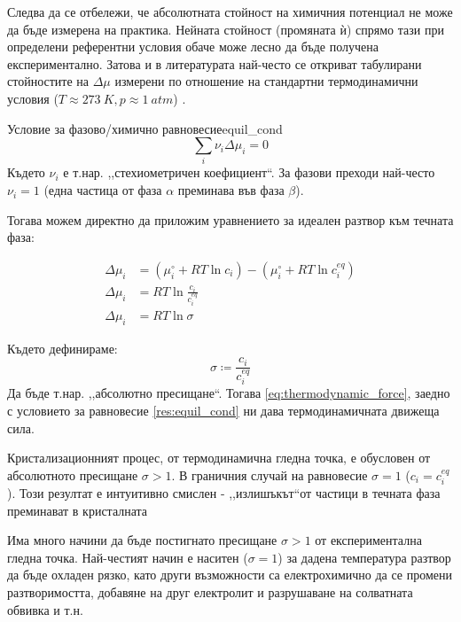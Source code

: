 \noindent Следва да се отбележи, че абсолютната стойност на химичния потенциал не може да бъде измерена на практика. Нейната стойност (промяната ѝ) спрямо тази при определени референтни условия обаче може лесно да бъде получена експериментално. Затова и в литературата най-често се откриват табулирани стойностите на $\Delta \mu$ измерени по отношение на стандартни термодинамични условия ($T \approx 273~K, p \approx 1~atm$) \cite{IvanMarkovCGB}\cite{atkinspaula2008}.

\begin{result}{Условие за фазово/химично равновесие}{equil_cond}
	\[\sum\limits_i \nu_i\Delta \mu_i  = 0\]
	Където $\nu_i$ е т.нар. ,,стехиометричен коефициент``. За фазови преходи най-често $\nu_i = 1$ (една частица от фаза $\alpha$ преминава във фаза $\beta$).
\end{result}

\noindent Тогава можем директно да приложим уравнението за идеален разтвор към течната фаза:

\begin{align}
	\Delta \mu_{i} & = \left( \mu_{i}^\circ + RT\ln{c_i} \right) - \left( \mu_{i}^\circ + RT\ln{c_{i}^{eq}} \right) \nonumber \\
	\Delta \mu_{i} & = RT\ln{\frac{c_i}{c_{i}^{eq}}} \nonumber                                                                \\
	\Delta \mu_{i} & = RT\ln{\sigma} \label{eq:thermodynamic_force}                                                           
\end{align}

\noindent Където дефинираме:
\begin{equation}
	\label{eq:abs_supersat}
	\sigma \coloneqq \frac{c_{i}}{c_{i}^{eq}}
\end{equation}
Да бъде т.нар. ,,абсолютно пресищане``. Тогава \autoref{eq:thermodynamic_force}, заедно с условието за равновесие \autoref{res:equil_cond} ни дава термодинамичната движеща сила.

Кристализационният процес, от термодинамична гледна точка, е обусловен от абсолютното пресищане $\sigma > 1$. В граничния случай на равновесие $\sigma = 1$ ($c_{i}  = c_{i}^{eq}$). Този резултат е интуитивно смислен - ,,излишъкът``от частици в течната фаза преминават в кристалната \cite{IvanMarkovCGB}

Има много начини да бъде постигнато пресищане $\sigma > 1$ от експериментална гледна точка. Най-честият начин е наситен ($\sigma = 1$) за дадена температура разтвор да бъде охладен рязко, като други възможности са електрохимично да се промени разтворимостта, добавяне на друг електролит и разрушаване на солватната обвивка и т.н. 

